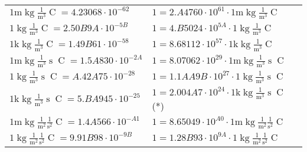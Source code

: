 \begin{center}
\begin{longtable}{l l}
{\color{gray}$1 \bm{\mathrm{ m}}\operatorname{kg}\frac1{\operatorname{m}^3}{}{\operatorname{C}}{} = 4.23068\cdot10^{-62} $}   & {\color{gray}$ 1 = 2.A4760\cdot10^{61} \cdot 1 \bm{\mathrm{ m}}\operatorname{kg}\frac1{\operatorname{m}^3}{}{\operatorname{C}}{}$}  \\
{\color{black}$1 \bm{\mathrm{ }}\operatorname{kg}\frac1{\operatorname{m}^3}{}{\operatorname{C}}{} = 2.50B9A\cdot10^{-5B} $}   & {\color{black}$ 1 = 4.B5024\cdot10^{5A} \cdot 1 \bm{\mathrm{ }}\operatorname{kg}\frac1{\operatorname{m}^3}{}{\operatorname{C}}{}$}  \\
{\color{gray}$1 \bm{\mathrm{ k}}\operatorname{kg}\frac1{\operatorname{m}^3}{}{\operatorname{C}}{} = 1.49B61\cdot10^{-58} $}   & {\color{gray}$ 1 = 8.68112\cdot10^{57} \cdot 1 \bm{\mathrm{ k}}\operatorname{kg}\frac1{\operatorname{m}^3}{}{\operatorname{C}}{}$}  \\
{\color{gray}$1 \bm{\mathrm{ m}}\operatorname{kg}\frac1{\operatorname{m}^3}{\operatorname{s}}{\operatorname{C}}{} = 1.5A830\cdot10^{-2A} $}   & {\color{gray}$ 1 = 8.07062\cdot10^{29} \cdot 1 \bm{\mathrm{ m}}\operatorname{kg}\frac1{\operatorname{m}^3}{\operatorname{s}}{\operatorname{C}}{}$}  \\
{\color{black}$1 \bm{\mathrm{ }}\operatorname{kg}\frac1{\operatorname{m}^3}{\operatorname{s}}{\operatorname{C}}{} = A.42A75\cdot10^{-28} $}   & {\color{black}$ 1 = 1.1AA9B\cdot10^{27} \cdot 1 \bm{\mathrm{ }}\operatorname{kg}\frac1{\operatorname{m}^3}{\operatorname{s}}{\operatorname{C}}{}$}  \\
{\color{gray}$1 \bm{\mathrm{ k}}\operatorname{kg}\frac1{\operatorname{m}^3}{\operatorname{s}}{\operatorname{C}}{} = 5.BA945\cdot10^{-25} $}   & {\color{gray}$ 1 = 2.004A7\cdot10^{24} \cdot 1 \bm{\mathrm{ k}}\operatorname{kg}\frac1{\operatorname{m}^3}{\operatorname{s}}{\operatorname{C}}{}$}\quad(*)\\
{\color{gray}$1 \bm{\mathrm{ m}}\operatorname{kg}\frac1{\operatorname{m}^2}\frac1{\operatorname{s}^2}{\operatorname{C}}{} = 1.4A566\cdot10^{-A1} $}   & {\color{gray}$ 1 = 8.65049\cdot10^{A0} \cdot 1 \bm{\mathrm{ m}}\operatorname{kg}\frac1{\operatorname{m}^2}\frac1{\operatorname{s}^2}{\operatorname{C}}{}$}  \\
{\color{black}$1 \bm{\mathrm{ }}\operatorname{kg}\frac1{\operatorname{m}^2}\frac1{\operatorname{s}^2}{\operatorname{C}}{} = 9.91B98\cdot10^{-9B} $}   & {\color{black}$ 1 = 1.28B93\cdot10^{9A} \cdot 1 \bm{\mathrm{ }}\operatorname{kg}\frac1{\operatorname{m}^2}\frac1{\operatorname{s}^2}{\operatorname{C}}{}$}  \\

\end{longtable}
\end{center}
